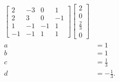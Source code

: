 \documentclass{article}
\begin{document}
\begin{align*}
\begin{bmatrix}
    2 & -3 & 0 & 1 \\
    2 & 3 & 0 & -1 \\
    1 & -1 & -1 & 1 \\
    -1 & -1 & 1 & 1
    \end{bmatrix} \begin{bmatrix}
    2 \\
    0 \\
    \frac{2}{3} \\
    0
    \end{bmatrix} \\
    a &= 1 \\
    b &= 1 \\
    c &= \frac{1}{3} \\
    d &= - \frac{1}{3}.
\end{align*}
\end{document}
